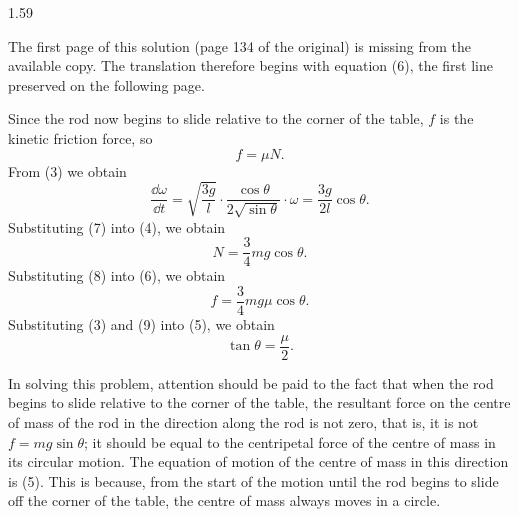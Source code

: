 \begin{solution}{1.59}
\begin{note}
The first page of this solution (page 134 of the original) is missing from the available copy.
The translation therefore begins with equation (6), the first line preserved on the following
page.
\end{note}
Since the rod now begins to slide relative to the corner of the table, $f$ is the kinetic
friction force, so
\begin{equation}
f=\mu N. \tag{6}
\end{equation}
From (3) we obtain
\begin{equation}
\frac{\dd\omega}{\dd t}
=\sqrt{\frac{3g}{l}}\cdot\frac{\cos\theta}{2\sqrt{\sin\theta}}\cdot\omega
=\frac{3g}{2l}\cos\theta. \tag{7}
\end{equation}
Substituting (7) into (4), we obtain
\begin{equation}
N=\frac{3}{4}mg\cos\theta. \tag{8}
\end{equation}
Substituting (8) into (6), we obtain
\begin{equation}
f=\frac{3}{4}mg\mu\cos\theta. \tag{9}
\end{equation}
Substituting (3) and (9) into (5), we obtain
\begin{equation*}
\tan\theta=\frac{\mu}{2}.
\end{equation*}

\begin{commentary}
In solving this problem, attention should be paid to the fact that when the rod begins to slide
relative to the corner of the table, the resultant force on the centre of mass of the rod in
the direction along the rod is not zero, that is, it is not $f=mg\sin\theta$; it should be
equal to the centripetal force of the centre of mass in its circular motion. The equation of
motion of the centre of mass in this direction is (5). This is because, from the start of the
motion until the rod begins to slide off the corner of the table, the centre of mass always
moves in a circle.
\end{commentary}
\end{solution}

